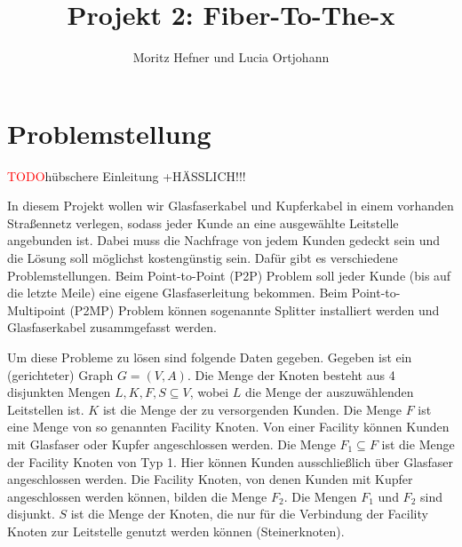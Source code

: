 \documentclass[11pt,a4paper]{article}
\title{Projekt 2: Fiber-To-The-x}
\author{Moritz Hefner und Lucia Ortjohann}
\newcommand{\TODO}{\textcolor{red}{TODO}}
\theoremstyle{my_th_style1}
\begin{document}
\maketitle
\thispagestyle{empty}
\newpage
\tableofcontents
\thispagestyle{empty}
\newpage
\setcounter{page}{1}



\section{Problemstellung}
\TODO hübschere Einleitung +HÄSSLICH!!!

In diesem Projekt wollen wir Glasfaserkabel und Kupferkabel in einem vorhanden Straßennetz verlegen, sodass jeder Kunde an eine ausgewählte Leitstelle angebunden ist. Dabei muss die Nachfrage von jedem Kunden gedeckt sein und die Lösung soll möglichst kostengünstig sein. Dafür gibt es verschiedene Problemstellungen. Beim Point-to-Point (P2P) Problem soll jeder Kunde (bis auf die letzte Meile) eine eigene Glasfaserleitung bekommen. Beim Point-to-Multipoint (P2MP) Problem können sogenannte Splitter installiert werden und Glasfaserkabel zusammgefasst werden.

Um diese Probleme zu lösen sind folgende Daten gegeben. 
Gegeben ist ein (gerichteter) Graph $G=(V,A)$. Die Menge der Knoten besteht aus 4 disjunkten Mengen $L,K,F,S \subseteq V$, wobei $L$ die Menge der auszuwählenden Leitstellen ist. $K$ ist die Menge der zu versorgenden Kunden. Die Menge $F$ ist eine Menge von so genannten Facility Knoten. Von einer Facility können Kunden mit Glasfaser oder Kupfer angeschlossen werden. Die Menge $F_1 \subseteq F$ ist die Menge der Facility Knoten von Typ 1. Hier können Kunden ausschließlich über Glasfaser angeschlossen werden. Die Facility Knoten, von denen Kunden mit Kupfer angeschlossen werden können, bilden die Menge $F_2$. Die Mengen $F_1$ und $F_2$ sind disjunkt.
$S$ ist die Menge der Knoten, die nur für die Verbindung der Facility Knoten zur Leitstelle genutzt werden k\"onnen (Steinerknoten). 
\end{document}
